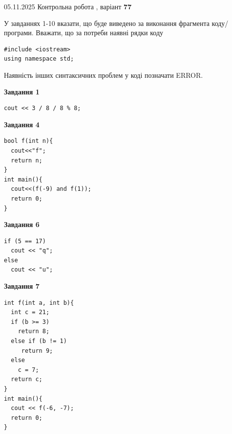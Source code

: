 \documentclass[12pt, ukrainian]{article}
\begin{document}
\newpage

{\Large{05.11.2025 Контрольна робота , варіант  \No \textbf { 77 }\par}}
{
\begin {large}
У завданнях 1-10 вказати, що буде виведено за виконання фрагмента коду/про\-гра\-ми.
Вважати, що за потреби наявні рядки коду
\begin{verbatim}
#include <iostream>
using namespace std;
\end{verbatim}
Наявність інших синтаксичних проблем у коді позначати ERROR.

\begin{minipage}[t]{7.0cm}

\begin{center}
\textbf{Завдання 1}
\end{center}
\vspace{-8mm}

\begin{verbatim}
cout << 3 / 8 / 8 % 8;
\end{verbatim}



\begin{center}
\textbf{Завдання 4}
\end{center}
\vspace{-8mm}

\begin{verbatim}
bool f(int n){
  cout<<"f";
  return n;
}
int main(){
  cout<<(f(-9) and f(1));
  return 0;
}
\end{verbatim}



\begin{center}
\textbf{Завдання 6}
\end{center}
\vspace{-8mm}

\begin{verbatim}
if (5 == 17)
  cout << "q";
else
  cout << "u";
\end{verbatim}



\begin{center}
\textbf{Завдання 7}
\end{center}
\vspace{-8mm}

\begin{verbatim}
int f(int a, int b){
  int c = 21;
  if (b >= 3)
    return 8;
  else if (b != 1)
     return 9;
  else
    c = 7;
  return c;
}
int main(){
  cout << f(-6, -7);
  return 0;
}
\end{verbatim}


\end{minipage}
\end{large}}
\end{document}
